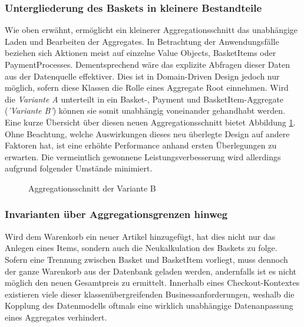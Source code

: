 \subsubsection{Untergliederung des Baskets in kleinere Bestandteile}


Wie oben erwähnt, ermöglicht ein kleinerer Aggregationsschnitt das unabhängige Laden und Bearbeiten der Aggregates. In Betrachtung der Anwendungsfälle beziehen sich Aktionen meist auf einzelne Value Objects, BasketItems oder PaymentProcesses. Dementsprechend wäre das explizite Abfragen dieser Daten aus der Datenquelle effektiver. Dies ist in Domain-Driven Design jedoch nur möglich, sofern diese Klassen die Rolle eines Aggregate Root einnehmen. Wird die \emph{Variante A} unterteilt in ein Basket-, Payment und BasketItem-Aggregate (\emph{'Variante B'}) können sie somit unabhängig voneinander gehandhabt werden. Eine kurze Übersicht über diesen neuen Aggregationsschnitt bietet Abbildung \ref{fig:VarB}. Ohne Beachtung, welche Auswirkungen dieses neu überlegte Design auf andere Faktoren hat, ist eine erhöhte Performance anhand ersten Überlegungen zu erwarten. Die vermeintlich gewonnene Leistungsverbesserung wird allerdings aufgrund folgender Umstände minimiert.

\begin{figure}[htbp]
	\centering
	
	\caption{Aggregationsschnitt der Variante B}
	\label{fig:VarB}
\end{figure}

\subsubsection{Invarianten über Aggregationsgrenzen hinweg}

Wird dem Warenkorb ein neuer Artikel hinzugefügt, hat dies nicht nur das Anlegen eines  Items, sondern auch die Neukalkulation des Baskets zu folge. Sofern eine Trennung zwischen Basket und BasketItem vorliegt, muss dennoch der ganze Warenkorb aus der Datenbank geladen werden, andernfalls ist es nicht möglich den neuen Gesamtpreis zu ermittelt. Innerhalb eines Checkout-Kontextes existieren viele dieser klassenübergreifenden Businessanforderungen, weshalb die Kopplung des Datenmodells oftmals eine wirklich unabhängige Datenanpassung eines Aggregates verhindert.

